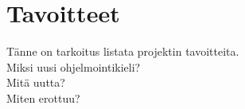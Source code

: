 \section{Tavoitteet}
Tänne on tarkoitus listata projektin tavoitteita.
\\
Miksi uusi ohjelmointikieli?
\\
Mitä uutta?
\\
Miten erottuu?
